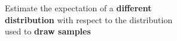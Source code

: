 \documentclass[preview]{standalone}
\begin{document}
\begin{center}
Estimate the expectation of a \textbf{different} \\ \textbf{distribution} with respect to the distribution \\ used to \textbf{draw samples}
\end{center}
\end{document}
